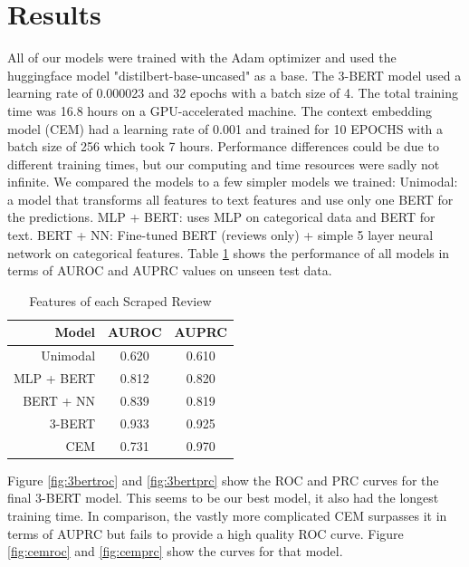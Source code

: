 \documentclass{article}
\begin{document}
\section{Results}
\label{sec:results}

All of our models were trained with the Adam optimizer and used the huggingface model "distilbert-base-uncased" as a base.
The 3-BERT model used a learning rate of 0.000023 and 32 epochs with a batch size of 4. The total training time was 16.8 hours on a GPU-accelerated machine.
The context embedding model (CEM) had a learning rate of 0.001 and trained for 10 EPOCHS with a batch size of 256 which took 7 hours. Performance differences could be due to different training times, but our computing and time resources were sadly not infinite. We compared the models to a few simpler models we trained: Unimodal: a model that transforms all features to text features and use only one BERT for the predictions. MLP + BERT:  uses MLP on categorical data and BERT for text. BERT + NN: Fine-tuned BERT (reviews only) + simple 5 layer neural network on categorical features.
Table \ref{tab:results} shows the performance of all models in terms of AUROC and AUPRC values on unseen test data.

\begin{table}[ht]
  \centering
  \caption{Features of each Scraped Review}
  \label{tab:results}
  \begin{tabular}{r|cc}
    Model      & AUROC & AUPRC \\
    \hline
    Unimodal   & 0.620 & 0.610 \\
    MLP + BERT & 0.812 & 0.820 \\
    BERT + NN  & 0.839 & 0.819 \\
    3-BERT     & 0.933 & 0.925 \\
    CEM        & 0.731 & 0.970 \\
  \end{tabular}
\end{table}

Figure \ref{fig:3bertroc} and \ref{fig:3bertprc} show the ROC and PRC curves for the final 3-BERT model. This seems to be our best model, it also had the longest training time. In comparison, the vastly more complicated CEM surpasses it in terms of AUPRC but fails to provide a high quality ROC curve. Figure \ref{fig:cemroc} and \ref{fig:cemprc} show the curves for that model.
\end{document}
